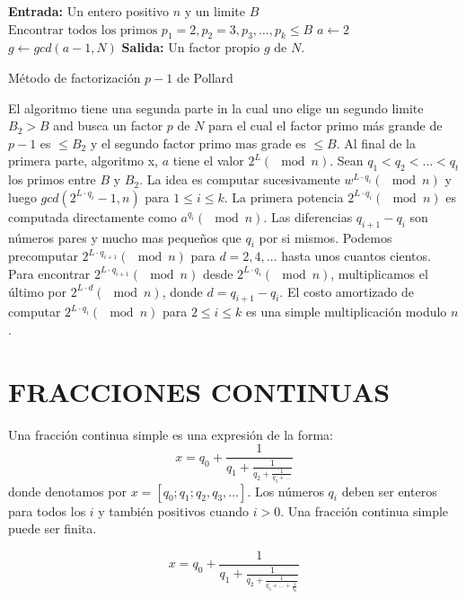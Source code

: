     \begin{algorithm}[H]
        \SetAlgoLined
        \textbf{Entrada:} Un entero positivo $n$ y un limite $B$\;
        $\text{Encontrar todos los primos } p_1= 2, p_2=3, p_3, \dots, p_k \leq B$\;
        $a \leftarrow 2$\;
        $g \leftarrow gcd(a-1, N)$\;
        \textbf{Salida:} Un factor propio $g$ de $N$.\ 
        \caption{Método de factorización $p-1$ de Pollard}
    \end{algorithm}

    El algoritmo tiene una segunda parte in la cual uno elige un segundo limite $B_{2} > B$ and busca un factor $p$ de $N$ para el cual el factor primo más grande de $p-1$ es $\leq B_{2}$ y el segundo factor primo mas grade es $\leq B$. Al final de la primera parte, algoritmo x, $a$ tiene el valor $2^{L} (\mod n)$. Sean $q_{1} < q_{2} < \dots < q_{t}$ los primos entre $B$ y $B_{2}$. La idea es computar sucesivamente $w^{L\cdot q_{i}} (\mod n)$ y luego $gcd(2^{L\cdot q_{i}}-1, n)$ para $1 \leq i \leq k$. La primera potencia $2^{L \cdot q_{i}} (\mod n)$ es computada directamente como $a^{q_{i}} (\mod n)$. Las diferencias $q_{i+1} - q_{i}$ son números pares y mucho mas pequeños que $q_{i}$ por si mismos. Podemos precomputar $2^{L\cdot q_{i+1}} (\mod n)$ para $d = 2, 4, \dots$ hasta unos cuantos cientos. Para encontrar $2^{L \cdot q_{i+1}}(\mod n)$ desde $2^{L \cdot q_{i}}(\mod n)$, multiplicamos el último por $2^{L \cdot d}(\mod n)$, donde $d = q_{i+1} - q_{i}$. El costo amortizado de computar $2^{L \cdot q_{i}}(\mod n)$ para $2 \leq i \leq k$ es una simple multiplicación modulo $n$.

    \section{FRACCIONES CONTINUAS}
    Una fracción continua simple es una expresión de la forma:
    \[
        x = q_{0} + \frac{1}{q_{1} + \frac{1}{q_2 + \frac{1}{q_3 + \dots}}}
    \]
    donde denotamos por $x = [q_{0};q_{1};q_{2},q_{3},\dots]$. Los números $q_i$ deben ser enteros para todos los $i$ y también positivos cuando $i > 0$. Una fracción continua simple puede ser finita.

    \[
        x = q_{0} + \frac{1}{q_{1} + \frac{1}{q_2 + \frac{1}{q_3 + \dots + \frac{1}{q_k}}}}
    \]

